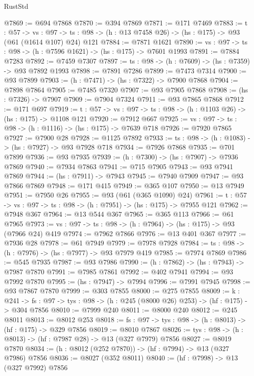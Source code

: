 \begin{lexlean}{RustStd}
\begin{coremodule}
@7869 := @694 @7868
@7870 := @394 @7869
@7871 := @171 @7469
@7883 := {t : @57} ->
  {vs : @97} -> {ts : @98} -> (h : @13 @7458 @26) -> (hs : @175) -> @93 (@61 (@1614 @107) @24) @121
@7884 := @7871 @1621
@7890 := {vs : @97} -> {ts : @98} -> (h : @7596 @1621) -> (hs : @175) -> @7601 @1993
@7891 := @7884 @7283
@7892 := @7459 @7307
@7897 := {ts : @98} -> (h : @7609) -> (hs : @7359) -> @93 @7892 @1993
@7898 := @7891 @7286
@7899 := @7473 @7314
@7900 := @93 @7899
@7903 := (h : @7471) -> (hs : @7322) -> @7900 @7868
@7904 := @7898 @7864
@7905 := @7485 @7320
@7907 := @93 @7905 @7868
@7908 := (hs : @7326) -> @7907
@7909 := @7904 @7324
@7911 := @93 @7865 @7868
@7912 := @171 @697
@7919 := {t : @57} -> {vs : @97} -> {ts : @98} -> (h : @1103 @26) -> (hs : @175) -> @1108 @121
@7920 := @7912 @667
@7925 := {vs : @97} -> {ts : @98} -> (h : @1116) -> (hs : @175) -> @7639 @718
@7926 := @7920 @7865
@7927 := @7900 @28
@7928 := @1125 @7892
@7933 := {ts : @98} -> (h : @1083) -> (hs : @7927) -> @93 @7928 @718
@7934 := @7926 @7868
@7935 := @701 @7899
@7936 := @93 @7935
@7939 := (h : @7300) -> (hs : @7907) -> @7936 @7869
@7940 := @7934 @7863
@7941 := @715 @7905
@7943 := @93 @7941 @7869
@7944 := (hs : @7911) -> @7943
@7945 := @7940 @7909
@7947 := @93 @7866 @7869
@7948 := @171 @415
@7949 := @365 @107
@7950 := @13 @7949
@7951 := @7950 @26
@7955 := @93 (@61 (@365 @1090) @24)
@7961 := {t : @57} -> {vs : @97} -> {ts : @98} -> (h : @7951) -> (hs : @175) -> @7955 @121
@7962 := @7948 @367
@7964 := @13 @544 @367
@7965 := @365 @113
@7966 := @61 @7965
@7973 := {vs : @97} -> {ts : @98} -> (h : @7964) -> (hs : @175) -> @93 (@7966 @24) @419
@7974 := @7962 @7866
@7976 := @13 @401 @367
@7977 := @7936 @28
@7978 := @61 @7949
@7979 := @7978 @7928
@7984 := {ts : @98} -> (h : @7976) -> (hs : @7977) -> @93 @7979 @419
@7985 := @7974 @7869
@7986 := @545 @7935
@7987 := @93 @7986
@7990 := (h : @7862) -> (hs : @7943) -> @7987 @7870
@7991 := @7985 @7861
@7992 := @402 @7941
@7994 := @93 @7992 @7870
@7995 := (hs : @7947) -> @7994
@7996 := @7991 @7945
@7998 := @93 @7867 @7870
@7999 := @303 @7855
@8000 := @275 @7855
@8009 := {k : @241} ->
  {fs : @97} -> {tys : @98} -> (h : @245 (@8000 @26) @253) -> (hf : @175) -> @304 @7856
@8010 := @7999 @240
@8011 := @8000 @240
@8012 := @245 @8011
@8013 := @8012 @253
@8018 := {fs : @97} -> {tys : @98} -> (h : @8013) -> (hf : @175) -> @329 @7856
@8019 := @8010 @7867
@8026 := {tys : @98} -> (h : @8013) -> (hf : @7987 @28) -> @13 (@327 @7979) @7856
@8027 := @8019 @7870
@8034 := (h : @8012 (@252 @7870)) -> (hf : @7994) -> @13 (@327 @7986) @7856
@8036 := @8027 (@352 @8011)
@8040 := (hf : @7998) -> @13 (@327 @7992) @7856

\end{coremodule}
\end{lexlean}
